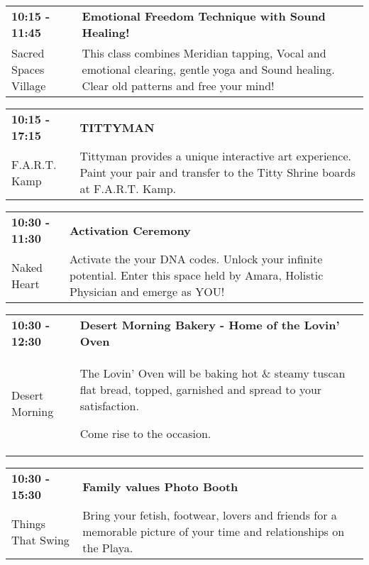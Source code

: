 \begin{tabular}{ p{1in} p{2.2in} }
    \textbf{10:15 - 11:45} & \textbf{Emotional Freedom Technique with Sound Healing!} \\
    Sacred Spaces Village \newline  & This class combines Meridian tapping, Vocal and emotional clearing, gentle yoga and Sound healing. Clear old patterns and free your mind! \\
    \hline 
\end{tabular}
    
\begin{tabular}{ p{1in} p{2.2in} }
    \textbf{10:15 - 17:15} & \textbf{TITTYMAN} \\
    F.A.R.T. Kamp \newline  & Tittyman provides a unique interactive art experience. Paint your pair and transfer to the Titty Shrine boards at F.A.R.T. Kamp. \\
    \hline 
\end{tabular}
    
\begin{tabular}{ p{1in} p{2.2in} }
    \textbf{10:30 - 11:30} & \textbf{Activation Ceremony} \\
    Naked Heart \newline  & Activate the your DNA codes. Unlock your infinite potential. Enter this space held by Amara, Holistic Physician and emerge as YOU! \\
    \hline 
\end{tabular}
    
\begin{tabular}{ p{1in} p{2.2in} }
    \textbf{10:30 - 12:30} & \textbf{Desert Morning Bakery - Home of the Lovin' Oven} \\
    Desert Morning \newline  & The Lovin' Oven will be baking hot \& steamy tuscan flat bread, topped, garnished and spread to your satisfaction.

Come rise to the occasion. \\
    \hline 
\end{tabular}
    
\begin{tabular}{ p{1in} p{2.2in} }
    \textbf{10:30 - 15:30} & \textbf{Family values Photo Booth} \\
    Things That Swing \newline  & Bring your fetish, footwear, lovers and friends for a memorable picture of your time and relationships on the Playa. \\
    \hline 
\end{tabular}
    
